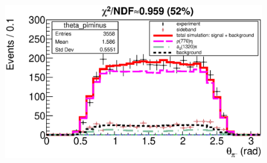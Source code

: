 \documentclass{beamer}
\begin{document}
\begin{frame}
\begin{minipage}[t]{0.48\linewidth}
\begin{figure}
    \end{figure}
  \end{minipage}
  \begin{minipage}[t]{0.48\linewidth}
    \begin{figure}
      \includegraphics[width=\linewidth]{figures/theta_piminus_g705.eps}
    \end{figure}
  \end{minipage}
\end{frame}
\end{document}
